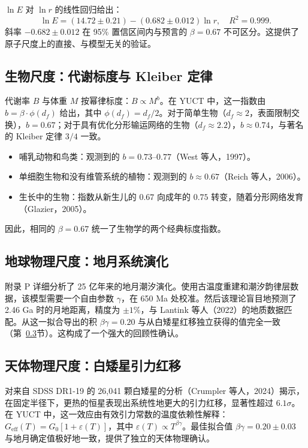 \documentclass[11pt,a4paper]{article}
\begin{document}
	\(\ln E\) 对 \(\ln r\) 的线性回归给出：
	\[
	\ln E = (14.72 \pm 0.21) - (0.682 \pm 0.012) \ln r, \quad R^2 = 0.999.
	\]
	斜率 \(-0.682 \pm 0.012\) 在 95\% 置信区间内与预言的 \(\beta = 0.67\) 不可区分。这提供了原子尺度上的直接、与模型无关的验证。
	
	\subsection{生物尺度：代谢标度与 Kleiber 定律}
	\label{subsec:metabolic-scaling}
	
	代谢率 \(B\) 与体重 \(M\) 按幂律标度：\(B \propto M^{b}\)。在 YUCT 中，这一指数由 \(b = \beta \cdot \phi(d_f)\) 给出，其中 \(\phi(d_f) = d_f/2\)。对于简单生物（\(d_f \approx 2\)，表面限制交换），\(b = 0.67\)；对于具有优化分形输运网络的生物（\(d_f \approx 2.2\)），\(b \approx 0.74\)，与著名的 Kleiber 定律 \(3/4\) 一致。
	
	\begin{itemize}
		\item 哺乳动物和鸟类：观测到的 \(b = 0.73\)–\(0.77\)（West 等人，1997）。
		\item 单细胞生物和没有维管系统的植物：观测到的 \(b \approx 0.67\)（Reich 等人，2006）。
		\item 生长中的生物：指数从新生儿的 \(0.67\) 向成年的 \(0.75\) 转变，随着分形网络发育（Glazier，2005）。
	\end{itemize}
	
	因此，相同的 \(\beta = 0.67\) 统一了生物学的两个经典标度指数。
	
	\subsection{地球物理尺度：地月系统演化}
	\label{subsec:earth-moon}
	
	附录 P 详细分析了 25 亿年来的地月潮汐演化。使用古温度重建和潮汐韵律层数据，该模型需要一个自由参数 \(\gamma\)，在 650 Ma 处校准。然后该理论盲目地预测了 2.46 Ga 时的月地距离，精度为 \(\pm 1\%\)，与 Lantink 等人（2022）的地质数据匹配。从这一拟合导出的积 \(\beta\gamma = 0.20\) 与从白矮星红移独立获得的值完全一致（第~\ref{subsec:wd}节）。这构成了一个强大的回顾性确认。
	
	\subsection{天体物理尺度：白矮星引力红移}
	\label{subsec:wd}
	
	对来自 SDSS DR1-19 的 26,041 颗白矮星的分析（Crumpler 等人，2024）揭示，在固定半径下，更热的恒星表现出系统性地更大的引力红移，显著性超过 \(6.1\sigma\)。在 YUCT 中，这一效应由有效引力常数的温度依赖性解释：\(G_{\mathrm{eff}}(T) = G_0[1 + \varepsilon(T)]\)，其中 \(\varepsilon(T) \propto T^{\beta\gamma}\)。最佳拟合值 \(\beta\gamma = 0.20 \pm 0.03\) 与地月确定值极好地一致，提供了独立的天体物理确认。
	
\end{document}
